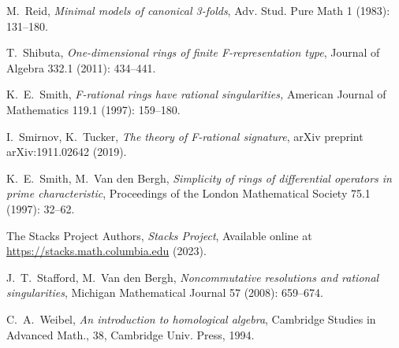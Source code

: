 \documentclass{amsart}
\theoremstyle{definition}
\begin{document}
\begin{thebibliography}{99}
 M.\ Reid, \emph{Minimal models of canonical 3-folds}, Adv. Stud. Pure Math 1 (1983): 131--180.

 T.\ Shibuta, \emph{One-dimensional rings of finite F-representation type}, Journal of Algebra 332.1 (2011): 434--441.

 K.\ E.\ Smith, \emph{F-rational rings have rational singularities,} American Journal of Mathematics 119.1 (1997): 159--180.

 I.\ Smirnov, K.\ Tucker, \emph{The theory of F-rational signature}, arXiv preprint arXiv:1911.02642 (2019).

 K.\ E.\ Smith, M.\ Van den Bergh, \emph{Simplicity of rings of differential operators in prime characteristic}, Proceedings of the London Mathematical Society 75.1 (1997): 32--62.

 The Stacks Project Authors, {\em Stacks Project}, Available online at \mbox{\url{https://stacks.math.columbia.edu}} (2023).

 J.\ T.\ Stafford, M.\ Van den Bergh, \emph{Noncommutative resolutions and rational singularities}, Michigan Mathematical Journal 57 (2008): 659--674.

 C.\ A.\ Weibel, \emph{An introduction to homological algebra}, Cambridge Studies in Advanced Math., 38, Cambridge Univ. Press, 1994.

\end{thebibliography}
\end{document}
